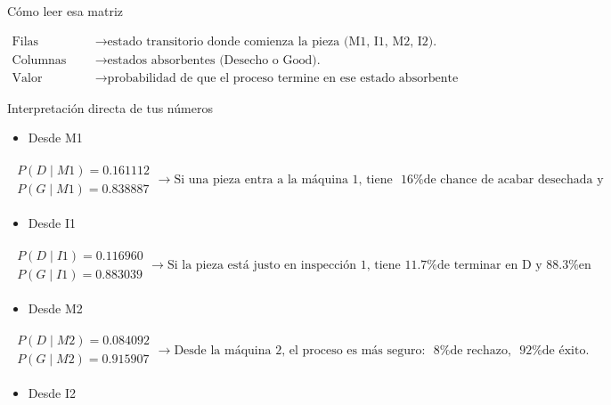 \documentclass[11pt]{article}
\begin{document}
Cómo leer esa matriz


\begin{align*}
\text{Filas} & \to \text{estado  transitorio donde comienza la pieza (M1, I1, M2, I2).} \\
\text{Columnas} & \to \text{estados  absorbentes (Desecho o Good).} \\
\text{Valor numérico} & \to \text{probabilidad de que el proceso termine en ese estado absorbente si arranca en ese transitorio.}
\end{align*}


Interpretación directa de tus números

\begin{itemize}
  \item Desde M1
\end{itemize}


\begin{align*}
\begin{matrix} 
P(D∣M1)=0.161112 \\
P(G∣M1)=0.838887
\end{matrix}
\to \text{Si una pieza entra a la máquina 1, tiene ~16\% de chance de acabar desechada y ~84\% de salir buena.}
\end{align*}


\begin{itemize}
  \item Desde I1
\end{itemize}


\begin{align*}
\begin{matrix} 
P(D∣I1)=0.116960 \\
P(G∣I1)=0.883039
\end{matrix}
\to \text{Si la pieza está justo en inspección 1, tiene 11.7\% de terminar en D y 88.3\% en G.}
\end{align*}


\begin{itemize}
  \item Desde M2
\end{itemize}


\begin{align*}
\begin{matrix} 
P(D∣M2)=0.084092 \\
P(G∣M2)=0.915907
\end{matrix}
\to \text{Desde la máquina 2, el proceso es más seguro: ~8\% de rechazo, ~92\% de éxito.}
\end{align*}


\begin{itemize}
  \item Desde I2
\end{itemize}
\end{document}
